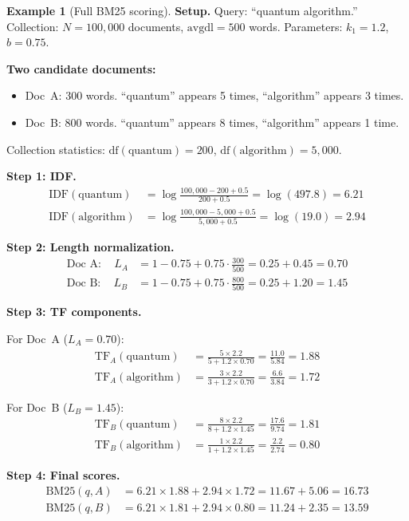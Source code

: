 \documentclass[11pt,a4paper]{article}
\theoremstyle{definition}
\newtheorem{example}{Example}[section]
\theoremstyle{plain}
\begin{document}
\begin{example}[Full BM25 scoring]
\textbf{Setup.} Query: ``quantum algorithm.'' Collection: $N = 100{,}000$ documents, $\text{avgdl} = 500$ words. Parameters: $k_1 = 1.2$, $b = 0.75$.

\textbf{Two candidate documents:}
\begin{itemize}
    \item Doc~A: 300 words. ``quantum'' appears 5 times, ``algorithm'' appears 3 times.
    \item Doc~B: 800 words. ``quantum'' appears 8 times, ``algorithm'' appears 1 time.
\end{itemize}

Collection statistics: $\text{df}(\text{quantum}) = 200$, $\text{df}(\text{algorithm}) = 5{,}000$.

\medskip
\textbf{Step 1: IDF.}
\begin{align*}
\text{IDF}(\text{quantum}) &= \log \frac{100{,}000 - 200 + 0.5}{200 + 0.5} = \log(497.8) = 6.21 \\
\text{IDF}(\text{algorithm}) &= \log \frac{100{,}000 - 5{,}000 + 0.5}{5{,}000 + 0.5} = \log(19.0) = 2.94
\end{align*}

\textbf{Step 2: Length normalization.}
\begin{align*}
\text{Doc A}: \quad L_A &= 1 - 0.75 + 0.75 \cdot \frac{300}{500} = 0.25 + 0.45 = 0.70 \\
\text{Doc B}: \quad L_B &= 1 - 0.75 + 0.75 \cdot \frac{800}{500} = 0.25 + 1.20 = 1.45
\end{align*}

\textbf{Step 3: TF components.}

For Doc~A ($L_A = 0.70$):
\begin{align*}
\text{TF}_A(\text{quantum}) &= \frac{5 \times 2.2}{5 + 1.2 \times 0.70} = \frac{11.0}{5.84} = 1.88 \\
\text{TF}_A(\text{algorithm}) &= \frac{3 \times 2.2}{3 + 1.2 \times 0.70} = \frac{6.6}{3.84} = 1.72
\end{align*}

For Doc~B ($L_B = 1.45$):
\begin{align*}
\text{TF}_B(\text{quantum}) &= \frac{8 \times 2.2}{8 + 1.2 \times 1.45} = \frac{17.6}{9.74} = 1.81 \\
\text{TF}_B(\text{algorithm}) &= \frac{1 \times 2.2}{1 + 1.2 \times 1.45} = \frac{2.2}{2.74} = 0.80
\end{align*}

\textbf{Step 4: Final scores.}
\begin{align*}
\text{BM25}(q, A) &= 6.21 \times 1.88 + 2.94 \times 1.72 = 11.67 + 5.06 = \mathbf{16.73} \\
\text{BM25}(q, B) &= 6.21 \times 1.81 + 2.94 \times 0.80 = 11.24 + 2.35 = \mathbf{13.59}
\end{align*}


\end{example}
\end{document}
